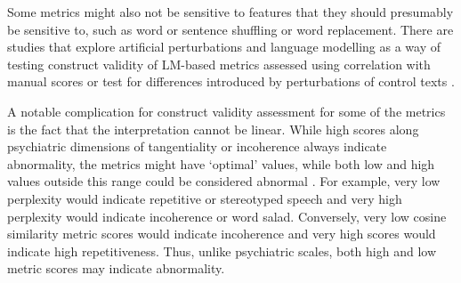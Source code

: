 
Some metrics might also not be sensitive to features that they should presumably be sensitive to, such as word or sentence shuffling or word replacement. There are studies that explore artificial perturbations and language modelling as a way of testing construct validity of LM-based metrics assessed using correlation with manual scores \citep{fradkin2023theory} or test for differences introduced by perturbations of control texts \citep{bedi2015automated, hitczenko2021understanding}.

A notable complication for construct validity assessment for some of the metrics is the fact that the interpretation cannot be linear. While high scores along psychiatric dimensions of tangentiality or incoherence always indicate abnormality, the metrics might have `optimal' values, while both low and high values outside this range could be considered abnormal \citep{fradkin2023theory}. For example, very low perplexity would indicate repetitive or stereotyped speech and very high perplexity would indicate incoherence or word salad. Conversely, very low cosine similarity metric scores would indicate incoherence and very high scores would indicate high repetitiveness. Thus, unlike psychiatric scales, both high and low metric scores may indicate abnormality.

